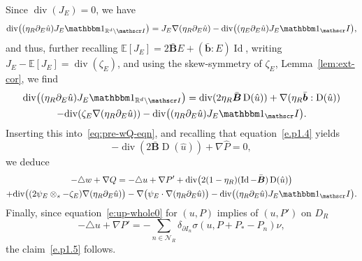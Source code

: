 \documentclass[10pt]{amsart}
\let\mathcal\mathscr
\let\mathds\mathbbm
\theoremstyle{plain}
\theoremstyle{definition}
\newcommand{\R}{\mathbb R}
\newcommand{\Ic}{\mathcal I}
\newcommand{\Nc}{\mathcal N}
\newcommand{\Id}{\operatorname{Id}}
\newcommand{\D}{\operatorname{D}}
\newcommand{\bb}{\bar{\boldsymbol b}}
\newcommand{\Bb}{\bar{\boldsymbol B}}
\newcommand{\Div}{{\operatorname{div}}}
\newcommand{\expec}[1]{\mathbb{E}\left[ #1 \right]}
\begin{document}
Since $\Div(J_E)=0$, we have
\[\Div\big((\eta_R\partial_E\hat u)J_E\mathds1_{\R^d\setminus\Ic}\big)=J_E\nabla(\eta_R\partial_E\hat u)-\Div\big((\eta_E\partial_E\hat u)J_E\mathds1_\Ic\big),\]
and thus, further recalling $\expec{J_E}=2\Bb E+(\bb:E)\Id$, writing $J_E-\expec{J_E}=\Div(\zeta_E)$, and using the skew-symmetry of $\zeta_E$, \cf Lemma~\ref{lem:ext-cor}, we find
\begin{multline*}
\Div\big((\eta_R\partial_E\hat u)J_E\mathds1_{\R^d\setminus\Ic}\big)=\Div(2\eta_R\Bb\D(\hat u))+\nabla(\eta_R\bb:\D(\hat u))\\
-\Div(\zeta_E\nabla(\eta_R\partial_E\hat u))-\Div\big((\eta_R\partial_E\hat u)J_E\mathds1_\Ic\big).
\end{multline*}
Inserting this into~\eqref{eq:pre-wQ-eqn}, and recalling that equation~\eqref{e.p1.4} yields
\[
-\Div(2\Bb\D(\hat u))+\nabla\hat P=0,
\]
we deduce
\begin{multline*}
-\triangle w+\nabla Q=-\triangle u+\nabla P'+\Div\big(2(1-\eta_R)(\Id-\Bb)\D(\hat u)\big)\\
+\Div\big((2\psi_E\otimes_s-\zeta_E)\nabla(\eta_R\partial_E\hat u)\big)-\nabla\big(\psi_{E}\cdot\nabla(\eta_R\partial_E\hat u)\big)
-\Div\big((\eta_R\partial_E\hat u)J_E\mathds1_\Ic\big).
\end{multline*}
Finally, since equation~\eqref{e:up-whole0} for $(u,P)$ implies of $(u,P')$ on $D_R$
\[-\triangle u+\nabla P'=-\sum_{n\in\Nc_R}\delta_{\partial I_n}\sigma(u,P+P_*-P_n)\nu,\]
the claim~\eqref{e.p1.5} follows.
\end{document}
